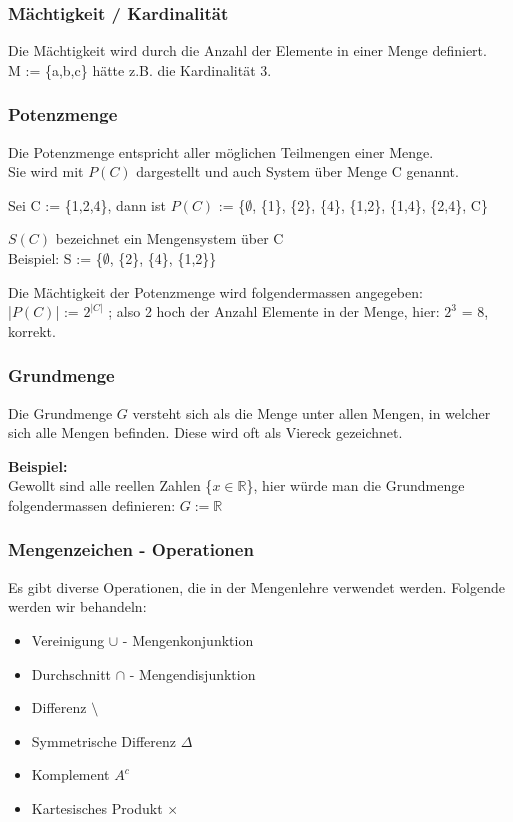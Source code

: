 \documentclass[a4paper,12pt]{article}
\begin{document}
\subsubsection{Mächtigkeit / Kardinalität}
Die Mächtigkeit wird durch die Anzahl der Elemente in einer Menge definiert. \\
M := \{a,b,c\} hätte z.B. die Kardinalität 3.

\subsubsection{Potenzmenge}
Die Potenzmenge entspricht aller möglichen Teilmengen einer Menge. \\
Sie wird mit \( P(C) \) dargestellt und auch System über Menge C genannt.

Sei C := \{1,2,4\}, dann ist \( P(C) \) := \{$\emptyset$,  \{1\}, \{2\}, \{4\}, \{1,2\}, \{1,4\}, \{2,4\}, C\}

\( S(C) \) bezeichnet ein Mengensystem über C \\
Beispiel: S := \{$\emptyset$,  \{2\}, \{4\}, \{1,2\}\}

Die Mächtigkeit der Potenzmenge wird folgendermassen angegeben: \\
|\( P(C) \)| := $2^{|C|}$ ; also 2 hoch der Anzahl Elemente in der Menge, hier: $2^{3}$ = 8, korrekt.

\subsubsection{Grundmenge}
Die Grundmenge $G$ versteht sich als die Menge unter allen Mengen, in welcher sich alle Mengen befinden. Diese wird oft als Viereck gezeichnet.

\textbf{Beispiel:} \\
Gewollt sind alle reellen Zahlen \{$x \in \mathbb{R}$\}, hier würde man die Grundmenge folgendermassen definieren: $G := \mathbb{R}$

\subsubsection{Mengenzeichen - Operationen}
Es gibt diverse Operationen, die in der Mengenlehre verwendet werden. Folgende werden wir behandeln:
\begin{itemize}
  \item Vereinigung $\cup$ - Mengenkonjunktion
  \item Durchschnitt $\cap$ - Mengendisjunktion
  \item Differenz $\setminus$
  \item Symmetrische Differenz $\Delta$
  \item Komplement $A^{c}$
  \item Kartesisches Produkt $\times$
\end{itemize}
\end{document}
